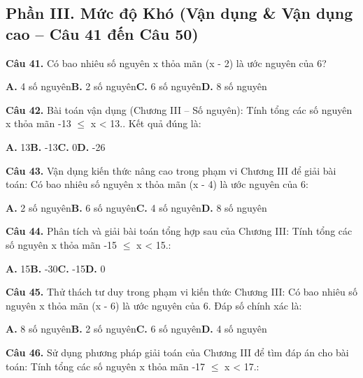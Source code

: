 \documentclass[11pt,a4paper]{article}
\begin{document}
\subsection*{\color{accent} Phần III. Mức độ Khó (Vận dụng \& Vận dụng cao -- Câu 41 đến Câu 50)}
\textbf{\color{primary} Câu 41.} Có bao nhiêu số nguyên x thỏa mãn (x - 2) là ước nguyên của 6?\par
\hspace*{1.5em}\textbf{A.} 4 số nguyên\quad\quad \textbf{B.} 2 số nguyên\quad\quad \textbf{C.} 6 số nguyên\quad\quad \textbf{D.} 8 số nguyên\par\vspace{2pt}
\textbf{\color{primary} Câu 42.} Bài toán vận dụng (Chương III – Số nguyên): Tính tổng các số nguyên x thỏa mãn -13 $\le$ x < 13.. Kết quả đúng là:\par
\hspace*{1.5em}\textbf{A.} 13\quad\quad \textbf{B.} -13\quad\quad \textbf{C.} 0\quad\quad \textbf{D.} -26\par\vspace{2pt}
\textbf{\color{primary} Câu 43.} Vận dụng kiến thức nâng cao trong phạm vi Chương III để giải bài toán: Có bao nhiêu số nguyên x thỏa mãn (x - 4) là ước nguyên của 6:\par
\hspace*{1.5em}\textbf{A.} 2 số nguyên\quad\quad \textbf{B.} 6 số nguyên\quad\quad \textbf{C.} 4 số nguyên\quad\quad \textbf{D.} 8 số nguyên\par\vspace{2pt}
\textbf{\color{primary} Câu 44.} Phân tích và giải bài toán tổng hợp sau của Chương III: Tính tổng các số nguyên x thỏa mãn -15 $\le$ x < 15.:\par
\hspace*{1.5em}\textbf{A.} 15\quad\quad \textbf{B.} -30\quad\quad \textbf{C.} -15\quad\quad \textbf{D.} 0\par\vspace{2pt}
\textbf{\color{primary} Câu 45.} Thử thách tư duy trong phạm vi kiến thức Chương III: Có bao nhiêu số nguyên x thỏa mãn (x - 6) là ước nguyên của 6. Đáp số chính xác là:\par
\hspace*{1.5em}\textbf{A.} 8 số nguyên\quad\quad \textbf{B.} 2 số nguyên\quad\quad \textbf{C.} 6 số nguyên\quad\quad \textbf{D.} 4 số nguyên\par\vspace{2pt}
\textbf{\color{primary} Câu 46.} Sử dụng phương pháp giải toán của Chương III để tìm đáp án cho bài toán: Tính tổng các số nguyên x thỏa mãn -17 $\le$ x < 17.:\par
\end{document}
